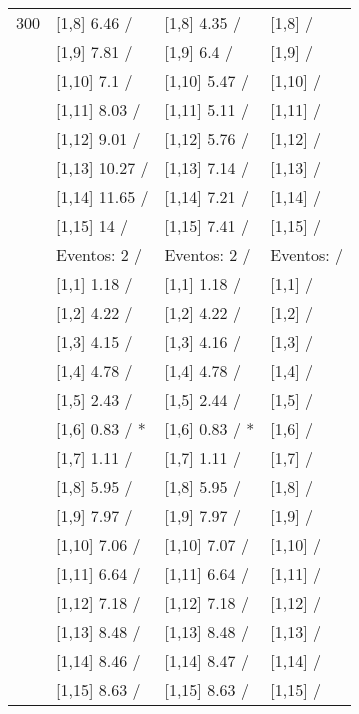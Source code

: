 \begin{table}
\begin{tabular}[t]{llll}
300 & {}[1,8] 6.46  / & {}[1,8] 4.35  / & {}[1,8]  /\\
\addlinespace
 & {}[1,9] 7.81  / & {}[1,9] 6.4  / & {}[1,9]  /\\
 & {}[1,10] 7.1  / & {}[1,10] 5.47  / & {}[1,10]  /\\
 & {}[1,11] 8.03  / & {}[1,11] 5.11  / & {}[1,11]  /\\
 & {}[1,12] 9.01  / & {}[1,12] 5.76  / & {}[1,12]  /\\
 & {}[1,13] 10.27  / & {}[1,13] 7.14  / & {}[1,13]  /\\
\addlinespace
 & {}[1,14] 11.65  / & {}[1,14] 7.21  / & {}[1,14]  /\\
 & {}[1,15] 14  / & {}[1,15] 7.41  / & {}[1,15]  /\\
 & Eventos:  2 / & Eventos:  2 / & Eventos:   /\\
 & {}[1,1] 1.18  / & {}[1,1] 1.18  / & {}[1,1]  /\\
 & {}[1,2] 4.22  / & {}[1,2] 4.22  / & {}[1,2]  /\\
\addlinespace
 & {}[1,3] 4.15  / & {}[1,3] 4.16  / & {}[1,3]  /\\
 & {}[1,4] 4.78  / & {}[1,4] 4.78  / & {}[1,4]  /\\
 & {}[1,5] 2.43  / & {}[1,5] 2.44  / & {}[1,5]  /\\
 & {}[1,6] 0.83  / * & {}[1,6] 0.83  / * & {}[1,6]  /\\
 & {}[1,7] 1.11  / & {}[1,7] 1.11  / & {}[1,7]  /\\
\addlinespace
500 & {}[1,8] 5.95  / & {}[1,8] 5.95  / & {}[1,8]  /\\
 & {}[1,9] 7.97  / & {}[1,9] 7.97  / & {}[1,9]  /\\
 & {}[1,10] 7.06  / & {}[1,10] 7.07  / & {}[1,10]  /\\
 & {}[1,11] 6.64  / & {}[1,11] 6.64  / & {}[1,11]  /\\
 & {}[1,12] 7.18  / & {}[1,12] 7.18  / & {}[1,12]  /\\
\addlinespace
 & {}[1,13] 8.48  / & {}[1,13] 8.48  / & {}[1,13]  /\\
 & {}[1,14] 8.46  / & {}[1,14] 8.47  / & {}[1,14]  /\\
 & {}[1,15] 8.63  / & {}[1,15] 8.63  / & {}[1,15]  /\\
\bottomrule
\end{tabular}
\end{table}
